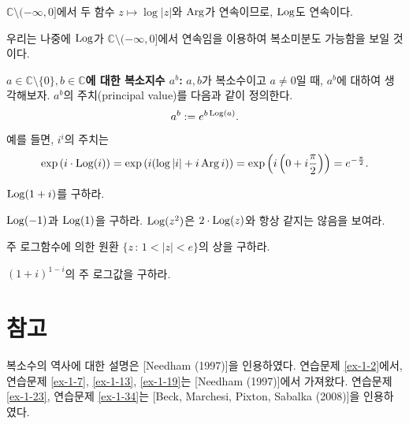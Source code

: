 $\mathbb C \setminus (-\infty,0]$에서 두 함수  $z\mapsto \log |z|$와 $\mathop{\mathrm{Arg}}$가 
연속이므로, $\mathop{\mathrm{Log}}$도 연속이다.

우리는 나중에 $\mathop{\mathrm{Log}}$가 $\mathbb C \setminus (-\infty,0]$에서 연속임을 이용하여
복소미분도 가능함을 보일 것이다.

{\bf $a\in \mathbb C\setminus \{0\}, b\in\mathbb C$에 대한 복소지수 $a^b$: }
$a,b$가 복소수이고 $a\ne0$일 때, $a^b$에 대하여 생각해보자.
$a^b$의 주치(principal value)를 다음과 같이 정의한다.
$$
a^b := e^{b\mathop{\mathrm{Log}}(a)}.
$$
예를 들면, $i^i$의 주치는
$$
\exp\left( i\cdot \mathop{\mathrm{Log}}(i) \right)
= \exp \left( i(\log|i| + i\mathop{\mathrm{Arg}} i) \right)
= \exp \left( i \left(0 + i\frac\pi2\right) \right) 
= e^{-\frac\pi2}.
$$

\begin{salt_exercise}\label{ex-1-40}
$\mathop{\mathrm{Log}} (1+i)$를 구하라.
\end{salt_exercise}

\begin{salt_exercise}\label{ex-1-41}
$\mathop{\mathrm{Log}}(-1)$과 $\mathop{\mathrm{Log}}(1)$을 구하라.
$\mathop{\mathrm{Log}}(z^ 2)$은 $2\cdot \mathop{\mathrm{Log}}(z)$와 항상 같지는 않음을 보여라.
\end{salt_exercise}

\begin{salt_exercise}\label{ex-42}
주 로그함수에 의한 원환 $\{ z\,:\, 1 < |z| <e \}$의 상을 구하라.
\end{salt_exercise}

\begin{salt_exercise}\label{ex-43}
$(1+i)^{1-i}$의 주 로그값을 구하라.
\end{salt_exercise}

\section{참고}
복소수의 역사에 대한 설명은 [Needham (1997)]을 인용하였다. %
연습문제 \ref{ex-1-2}\는 [Shastri (2000)]에서, 
연습문제 \ref{ex-1-7},  \ref{ex-1-13}, \ref{ex-1-19}는 [Needham (1997)]에서 가져왔다.
연습문제 \ref{ex-1-23}, 연습문제 \ref{ex-1-34}는 [Beck, Marchesi, Pixton, Sabalka (2008)]을 인용하였다.



